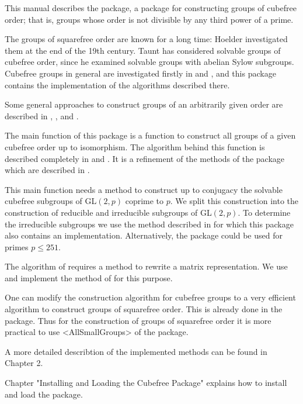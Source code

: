 



This manual describes the {\Cubefree}  package,
a {\GAP} package for constructing groups of cubefree order; that is, groups
whose order is not divisible by any third power of a prime.

The groups of squarefree order are known for a long time: Hoelder
\cite{Hol93} investigated them at the end of the 19th century. Taunt
\cite{Tau55} has considered solvable groups of cubefree order, since he
examined solvable groups with abelian Sylow subgroups. Cubefree groups in
general are investigated firstly in \cite{Di05} and \cite{DiEi05}, and this
package contains the implementation of the algorithms described
there.

Some general approaches to construct groups of an arbitrarily given order are
described in \cite{BeEia}, \cite{BeEib}, and \cite{BeEiO}.

The main function of this package is a function to construct 
all groups of a given cubefree order up to isomorphism. The algorithm behind this function is
described completely in \cite{Di05} and \cite{DiEi05}. It is a refinement of
the methods of the {\GrpConst} package which are described in \cite{GrpConst}.

This main function needs a method to construct up to conjugacy the solvable
cubefree subgroups of GL$(2,p)$ coprime to $p$. We split this construction
into the construction of reducible and irreducible subgroups of GL$(2,p)$. To determine the
irreducible subgroups we use the method described in \cite{FlOB05} for which this package
also contains an implementation. Alternatively, the {\Irredsol} package
\cite{Irredsol} could be used for primes $p\le 251$.

The algorithm of \cite{FlOB05} requires a method to rewrite a matrix
representation. We use and implement the method of \cite{GlHo97} for this purpose.

One can modify the construction algorithm for cubefree groups to a very
efficient algorithm to construct groups of squarefree order. This is already
done in the  {\GrpConst} package. Thus for the construction of groups of squarefree order it is more practical to
use <AllSmallGroups> of the {\GrpConst} package. 

A more detailed describtion of the implemented methods can be found in Chapter 2.

Chapter "Installing and Loading the Cubefree Package" explains
how to install and load the {\Cubefree} package.
